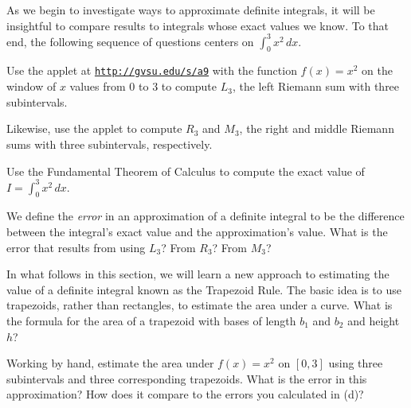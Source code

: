\begin{pa} \label{PA:5.6}
As we begin to investigate ways to approximate definite integrals, it will be insightful to compare results to integrals whose exact values we know.  To that end, the following sequence of questions centers on $\int_0^3 x^2 \, dx$.
\ba
	\item Use the applet at \href{http://gvsu.edu/s/a9}{\texttt{http://gvsu.edu/s/a9}} with the function $f(x) = x^2$ on the window of $x$ values from $0$ to $3$ to compute $L_3$, the left Riemann sum with three subintervals.
	\item Likewise, use the applet to compute $R_3$ and $M_3$, the right and middle Riemann sums with three subintervals, respectively.
	\item Use the Fundamental Theorem of Calculus to compute the exact value of $I = \int_0^3 x^2 \, dx$.
	\item We define the \emph{error} in an approximation of a definite integral to be the difference between the integral's exact value and the approximation's value.  What is the error that results from using $L_3$? From $R_3$?  From $M_3$?
	\item In what follows in this section, we will learn a new approach to estimating the value of a definite integral known as the Trapezoid Rule.  The basic idea is to use trapezoids, rather than rectangles, to estimate the area under a curve.  What is the formula for the area of a trapezoid with bases of length $b_1$ and $b_2$ and height $h$?
	\item Working by hand, estimate the area under $f(x) = x^2$ on $[0,3]$ using three subintervals and three corresponding trapezoids.  What is the error in this approximation?  How does it compare to the errors you calculated in (d)?
\ea
\end{pa} 
\afterpa